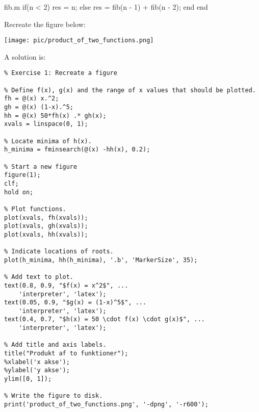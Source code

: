\begin{ex}
\begin{solutionfile}{fib.m}
if(n < 2)
  res = n;
else
  res = fib(n - 1) + fib(n - 2);
end
end
\end{solutionfile}
\end{ex}





\begin{ex}
Recreate the figure below:
\begin{center}
\texttt{[image: pic/product\_of\_two\_functions.png]}
\end{center}
\begin{hint}
\end{hint}
\begin{sol}
A solution is:
\begin{lstlisting}
% Exercise 1: Recreate a figure

% Define f(x), g(x) and the range of x values that should be plotted.
fh = @(x) x.^2;
gh = @(x) (1-x).^5;
hh = @(x) 50*fh(x) .* gh(x);
xvals = linspace(0, 1);

% Locate minima of h(x).
h_minima = fminsearch(@(x) -hh(x), 0.2);

% Start a new figure
figure(1);
clf;
hold on;

% Plot functions.
plot(xvals, fh(xvals));
plot(xvals, gh(xvals));
plot(xvals, hh(xvals));

% Indicate locations of roots.
plot(h_minima, hh(h_minima), '.b', 'MarkerSize', 35);

% Add text to plot.
text(0.8, 0.9, "$f(x) = x^2$", ...
    'interpreter', 'latex');
text(0.05, 0.9, "$g(x) = (1-x)^5$", ...
    'interpreter', 'latex');
text(0.4, 0.7, "$h(x) = 50 \cdot f(x) \cdot g(x)$", ...
    'interpreter', 'latex');

% Add title and axis labels.
title("Produkt af to funktioner");
%xlabel('x akse');
%ylabel('y akse');
ylim([0, 1]);

% Write the figure to disk.
print('product_of_two_functions.png', '-dpng', '-r600');
\end{lstlisting}
\end{sol}
\end{ex}







